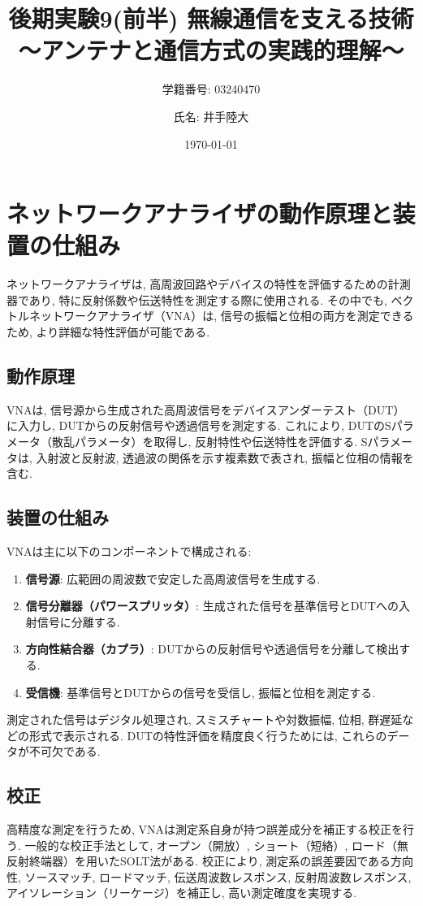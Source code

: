 \documentclass[a4paper, twocolumn]{article} %
\title{後期実験9(前半) 無線通信を支える技術
～アンテナと通信方式の実践的理解～}
\author{学籍番号: 03240470 \and 氏名: 井手陸大}
\date{\today}
\begin{document}
\maketitle

\section{ネットワークアナライザの動作原理と装置の仕組み}
ネットワークアナライザは, 高周波回路やデバイスの特性を評価するための計測器であり, 特に反射係数や伝送特性を測定する際に使用される. その中でも, ベクトルネットワークアナライザ（VNA）は, 信号の振幅と位相の両方を測定できるため, より詳細な特性評価が可能である.

\subsection{動作原理}
VNAは, 信号源から生成された高周波信号をデバイスアンダーテスト（DUT）に入力し, DUTからの反射信号や透過信号を測定する. これにより, DUTのSパラメータ（散乱パラメータ）を取得し, 反射特性や伝送特性を評価する. Sパラメータは, 入射波と反射波, 透過波の関係を示す複素数で表され, 振幅と位相の情報を含む.

\subsection{装置の仕組み}
VNAは主に以下のコンポーネントで構成される:
\begin{enumerate}
    \item \textbf{信号源}: 広範囲の周波数で安定した高周波信号を生成する.
    \item \textbf{信号分離器（パワースプリッタ）}: 生成された信号を基準信号とDUTへの入射信号に分離する.
    \item \textbf{方向性結合器（カプラ）}: DUTからの反射信号や透過信号を分離して検出する.
    \item \textbf{受信機}: 基準信号とDUTからの信号を受信し, 振幅と位相を測定する.
\end{enumerate}

測定された信号はデジタル処理され, スミスチャートや対数振幅, 位相, 群遅延などの形式で表示される. DUTの特性評価を精度良く行うためには, これらのデータが不可欠である.

\subsection{校正}
高精度な測定を行うため, VNAは測定系自身が持つ誤差成分を補正する校正を行う. 一般的な校正手法として, オープン（開放）, ショート（短絡）, ロード（無反射終端器）を用いたSOLT法がある. 校正により, 測定系の誤差要因である方向性, ソースマッチ, ロードマッチ, 伝送周波数レスポンス, 反射周波数レスポンス, アイソレーション（リーケージ）を補正し, 高い測定確度を実現する.
\end{document}
